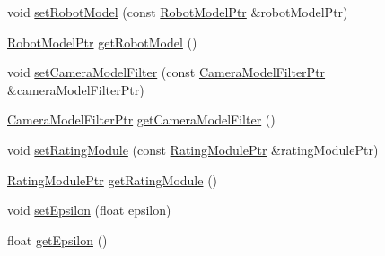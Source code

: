 \begin{DoxyCompactItemize}
\item 
void \hyperlink{classnext__best__view_1_1NextBestViewCalculator_a7bee92fcaa8fcde9e71b50ad9c553480}{set\-Robot\-Model} (const \hyperlink{namespacenext__best__view_ad248a43c564dbbea474aa87f0fb56b22}{\-Robot\-Model\-Ptr} \&robot\-Model\-Ptr)
\item 
\hyperlink{namespacenext__best__view_ad248a43c564dbbea474aa87f0fb56b22}{\-Robot\-Model\-Ptr} \hyperlink{classnext__best__view_1_1NextBestViewCalculator_ad8aa77e7341f5e6da8946bc3bc2fd60b}{get\-Robot\-Model} ()
\item 
void \hyperlink{classnext__best__view_1_1NextBestViewCalculator_a9a6edf64487998d3fcea474ad6580738}{set\-Camera\-Model\-Filter} (const \hyperlink{namespacenext__best__view_a75c548145a1fdcdc491efbda66e9f440}{\-Camera\-Model\-Filter\-Ptr} \&camera\-Model\-Filter\-Ptr)
\item 
\hyperlink{namespacenext__best__view_a75c548145a1fdcdc491efbda66e9f440}{\-Camera\-Model\-Filter\-Ptr} \hyperlink{classnext__best__view_1_1NextBestViewCalculator_a21bc919940a7bb078679706e05defaf9}{get\-Camera\-Model\-Filter} ()
\item 
void \hyperlink{classnext__best__view_1_1NextBestViewCalculator_a180931d8a9f47d34fbe285d744058574}{set\-Rating\-Module} (const \hyperlink{namespacenext__best__view_a0fd3a238157d0632d802531f590682ec}{\-Rating\-Module\-Ptr} \&rating\-Module\-Ptr)
\item 
\hyperlink{namespacenext__best__view_a0fd3a238157d0632d802531f590682ec}{\-Rating\-Module\-Ptr} \hyperlink{classnext__best__view_1_1NextBestViewCalculator_ab3ae17ee6c0083e7541406cc6cd4f840}{get\-Rating\-Module} ()
\item 
void \hyperlink{classnext__best__view_1_1NextBestViewCalculator_a677eda7f0bcd8b9d2f9374c3781e2fb1}{set\-Epsilon} (float epsilon)
\item 
float \hyperlink{classnext__best__view_1_1NextBestViewCalculator_ac757d1710a046b37628ebb452eb9c428}{get\-Epsilon} ()
\end{DoxyCompactItemize}


